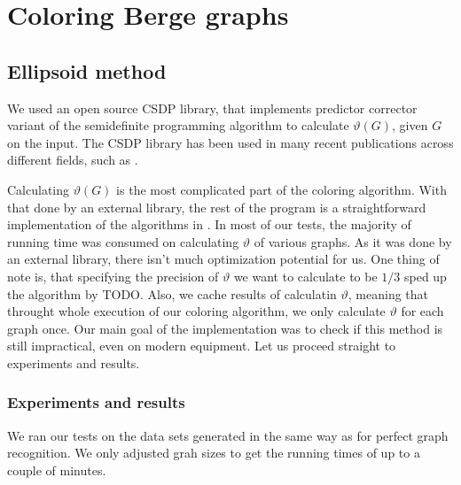 
\section{Coloring Berge graphs}

\subsection{Ellipsoid method}

We used an open source CSDP \cite{csdpRepo, csdp1999} library, that implements predictor corrector variant of the semidefinite programming algorithm to calculate $\vartheta(G)$, given $G$ on the input. The CSDP library has been used in many recent publications across different fields, such as \cite{Ampountolas_2017, Adasme_2011}.

Calculating $\vartheta(G)$ is the most complicated part of the coloring algorithm. With that done by an external library, the rest of the program is a straightforward implementation of the algorithms in . In most of our tests, the majority of running time was consumed on calculating $\vartheta$ of various graphs. As it was done by an external library, there isn't much optimization potential for us. One thing of note is, that specifying the precision of $\vartheta$ we want to calculate to be $1/3$ sped up the algorithm by TODO. Also, we cache results of calculatin $\vartheta$, meaning that throught whole execution of our coloring algorithm, we only calculate $\vartheta$ for each graph once. Our main goal of the implementation was to check if this method is still impractical, even on modern equipment. Let us proceed straight to experiments and results.

\subsubsection{Experiments and results}

We ran our tests on the data sets generated in the same way as for perfect graph recognition. We only adjusted grah sizes to get the running times of up to a couple of minutes. 

